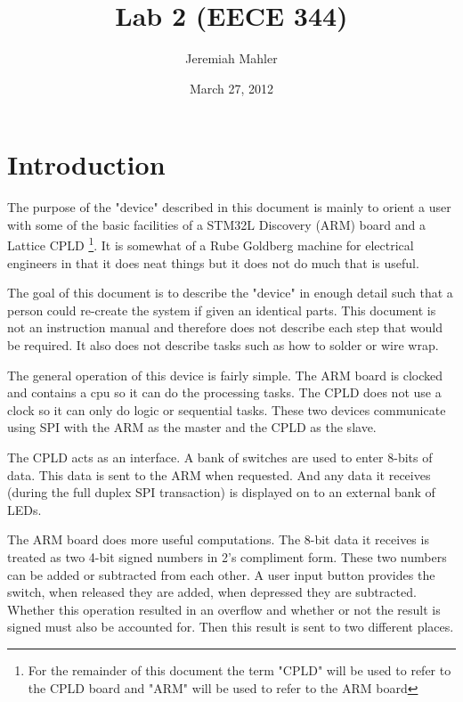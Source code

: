 \documentclass{article}
\begin{document}

\title{Lab 2 (EECE 344)}
\date{March 27, 2012}
\author{Jeremiah Mahler}

\maketitle

\tableofcontents

\pagebreak

\section{Introduction}

The purpose of the "device" described in this document is mainly
to orient a user with some of the basic facilities of a STM32L Discovery\citep{UM1079}
(ARM) board and a Lattice CPLD\cite{EB66}
\footnote{For the remainder of this document the term "CPLD" will
be used to refer to the CPLD board and "ARM" will be used to
refer to the ARM board}.
It is somewhat of a Rube Goldberg machine for electrical engineers
in that it does neat things but it does not do much that is useful.

The goal of this document is to describe the "device" in enough
detail such that a person could re-create the system if given
an identical parts.
This document is not an instruction manual and therefore does not
describe each step that would be required.
It also does not describe tasks such as how to solder or wire wrap.

The general operation of this device is fairly simple.
The ARM board is clocked and contains a cpu so it can do the processing
tasks.
The CPLD does not use a clock so it can only do logic or sequential tasks.
These two devices communicate using SPI with the ARM as the master and
the CPLD as the slave.

The CPLD acts as an interface.
A bank of switches are used to enter 8-bits of data.
This data is sent to the ARM when requested.
And any data it receives (during the full duplex SPI transaction)
is displayed on to an external bank of LEDs.

The ARM board does more useful computations.
The 8-bit data it receives is treated as two 4-bit signed numbers
in 2's compliment form.
These two numbers can be added or subtracted from each other.
A user input button provides the switch, when released they are
added, when depressed they are subtracted.
Whether this operation resulted in an overflow and whether or
not the result is signed must also be accounted for.
Then this result is sent to two different places.
\end{document}
